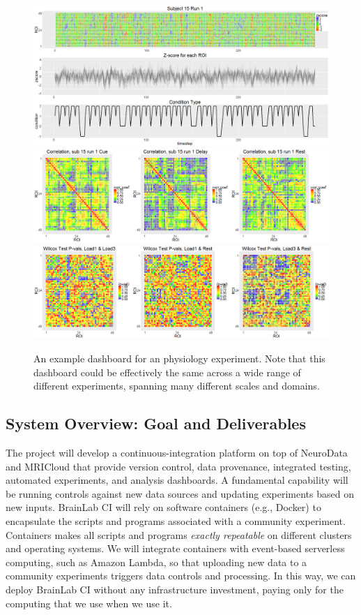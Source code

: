 \begin{figure}%
\includegraphics[width=1\textwidth]{sub-15_run1heat.png}
\includegraphics[width=1\textwidth]{sub-15_run1corr.png}
\includegraphics[width=1\textwidth]{overall_corr_wilcox.png}
\caption{An example dashboard for an physiology experiment.  Note that this dashboard could be effectively the same across a wide range of different experiments, spanning many different scales and domains.
}
\label{f:wilcox}
\end{figure}



\subsection{System Overview: Goal and Deliverables}

The project will develop a continuous-integration platform on top of NeuroData \cite{nd} and 
MRICloud that provide 
version control, data provenance, integrated testing, automated experiments, and analysis dashboards.  
A fundamental capability will be running controls against new data sources and updating experiments 
based on new inputs.  BrainLab CI will rely on software containers (e.g., Docker) 
to encapsulate the scripts and programs associated with a community experiment.  
Containers makes all scripts and programs {\em exactly repeatable} on different clusters and operating systems.  We will integrate containers with event-based serverless computing, 
such as Amazon Lambda, so that uploading new data to a community experiments triggers data controls and processing.  In this way, 
we can deploy BrainLab CI without any infrastructure investment, paying only for the computing that we use when we use it.

